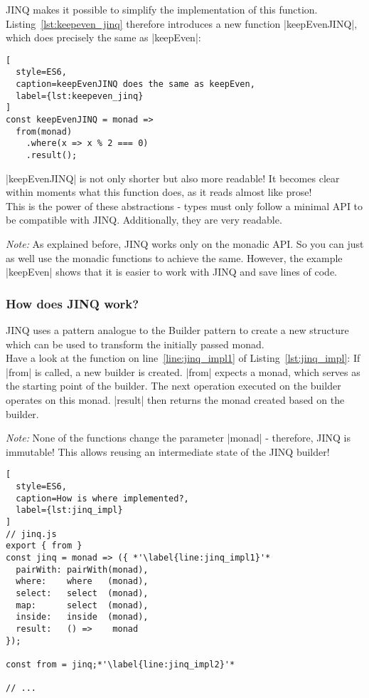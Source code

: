 JINQ makes it possible to simplify the implementation of this function.
Listing~\ref{lst:keepeven_jinq} therefore introduces a new function
|keepEvenJINQ|, which does precisely the same as |keepEven|:

\begin{lstlisting}[
  style=ES6,
  caption=keepEvenJINQ does the same as keepEven,
  label={lst:keepeven_jinq}
]
const keepEvenJINQ = monad =>
  from(monad)
    .where(x => x % 2 === 0)
    .result();
\end{lstlisting}

|keepEvenJINQ| is not only shorter but also more readable! It becomes clear
within moments what this function does, as it reads almost like prose!\\
This is the power of these abstractions - types must only follow a
minimal API to be compatible with JINQ. Additionally, they are very readable.

\textit{Note:} As explained before, JINQ works only on the monadic API. So you
can just as well use the monadic functions to achieve the same. However, the
example |keepEven| shows that it is easier to work with JINQ and save lines of
code.

\subsubsection{How does JINQ work?} %
\label{subsub:How does JINQ work?}
JINQ uses a pattern analogue to the Builder pattern
\cite[Chapter~3.2]{gang_of_four_depa} to create a new structure which can be
used to transform the initially passed monad. \\
Have a look at the function on line~\ref{line:jinq_impl1} of
Listing~\ref{lst:jinq_impl}: If |from| is called, a new builder is created.
|from| expects a monad, which serves as the starting point of the builder. The
next operation executed on the builder operates on this monad. |result| then
returns the monad created based on the builder.

\textit{Note:} None of the functions change the parameter |monad| - therefore,
JINQ is immutable! This allows reusing an intermediate state of the JINQ
builder!

\begin{lstlisting}[
  style=ES6,
  caption=How is where implemented?,
  label={lst:jinq_impl}
]
// jinq.js
export { from }
const jinq = monad => ({ *'\label{line:jinq_impl1}'*
  pairWith: pairWith(monad),
  where:    where   (monad),
  select:   select  (monad),
  map:      select  (monad),
  inside:   inside  (monad),
  result:   () =>    monad
});

const from = jinq;*'\label{line:jinq_impl2}'*

// ...
\end{lstlisting}

